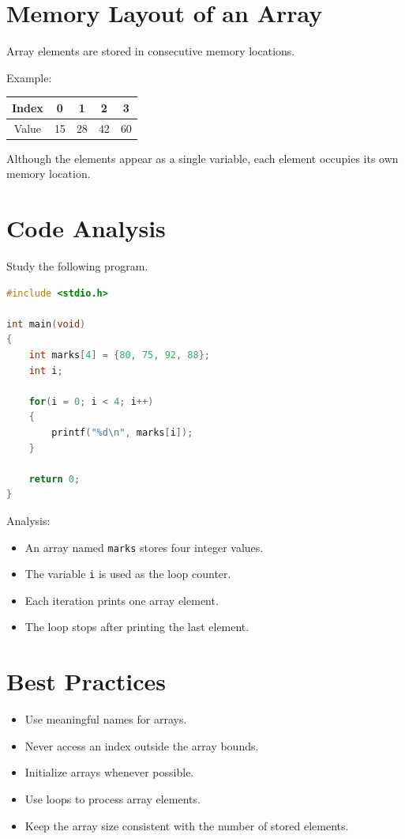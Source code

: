 \documentclass[12pt,openany]{book}
\begin{document}
\section{Memory Layout of an Array}

Array elements are stored in consecutive memory locations.

Example:

\begin{center}
\begin{tabular}{|c|c|c|c|c|}
\hline
Index & 0 & 1 & 2 & 3 \\
\hline
Value & 15 & 28 & 42 & 60 \\
\hline
\end{tabular}
\end{center}

Although the elements appear as a single variable, each element occupies its own memory location.

\section{Code Analysis}

Study the following program.

\begin{lstlisting}[language=C]
#include <stdio.h>

int main(void)
{
    int marks[4] = {80, 75, 92, 88};
    int i;

    for(i = 0; i < 4; i++)
    {
        printf("%d\n", marks[i]);
    }

    return 0;
}
\end{lstlisting}

Analysis:

\begin{itemize}
    \item An array named \texttt{marks} stores four integer values.
    \item The variable \texttt{i} is used as the loop counter.
    \item Each iteration prints one array element.
    \item The loop stops after printing the last element.
\end{itemize}

\section{Best Practices}

\begin{itemize}
    \item Use meaningful names for arrays.
    \item Never access an index outside the array bounds.
    \item Initialize arrays whenever possible.
    \item Use loops to process array elements.
    \item Keep the array size consistent with the number of stored elements.
\end{itemize}
\end{document}

